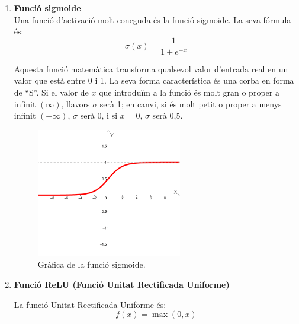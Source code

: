 \begin{enumerate}
    \item \label{sigmoide}{\textbf{Funció sigmoide}}\\
    Una funció d'activació molt coneguda és la funció sigmoide. La seva fórmula és:
    $$ \sigma(x) = \frac{1}{1 + e^{-x}} $$

    Aquesta funció matemàtica transforma qualsevol valor d'entrada real en un valor que està entre 0 i 1. La seva forma característica és una corba en forma de ``S''. Si el valor de $x$ que introduïm a la funció és molt gran o proper a infinit $(\infty)$, llavors $\sigma$ serà 1; en canvi, si és molt petit o proper a menys infinit $(-\infty)$, $\sigma$ serà 0, i si $x = 0$, $\sigma$ serà 0,5.

    \begin{figure}[h!]
        \centering
        \includegraphics[width=0.6\textwidth]{./figures/grafica_sigmoide.png}
        \caption{Gràfica de la funció sigmoide.~\cite{Img_sigmoide}}
    \end{figure}
\clearpage
    \item \hypertarget{subsec:1}{\textbf{Funció ReLU (Funció Unitat Rectificada Uniforme)}}

    La funció Unitat Rectificada Uniforme és:
    $$f(x) = \max(0, x)$$


\end{enumerate}
